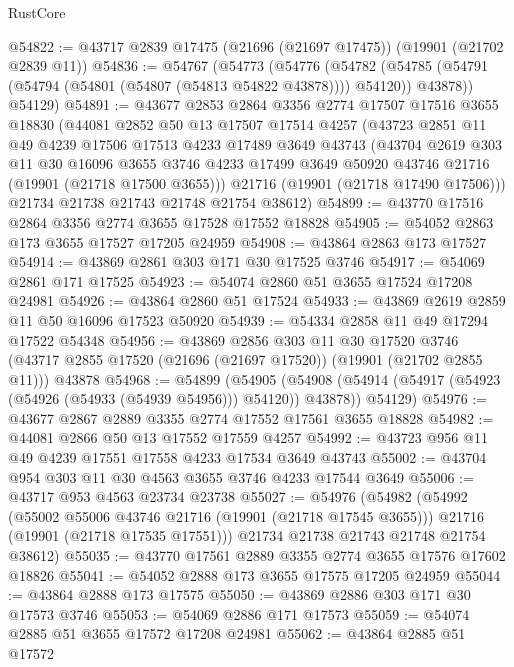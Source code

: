 \begin{lexlean}{RustCore}
\begin{coremodule}
@54822 := @43717 @2839 @17475 (@21696 (@21697 @17475)) (@19901 (@21702 @2839 @11))
@54836 := @54767
    (@54773
      (@54776
        (@54782 (@54785 (@54791 (@54794 (@54801 (@54807 (@54813 @54822 @43878)))) @54120)) @43878))
      @54129)
@54891 := @43677
    @2853
    @2864
    @3356
    @2774
    @17507
    @17516
    @3655
    @18830
    (@44081
      @2852
      @50
      @13
      @17507
      @17514
      @4257
      (@43723
        @2851
        @11
        @49
        @4239
        @17506
        @17513
        @4233
        @17489
        @3649
        @43743
        (@43704
          @2619
          @303
          @11
          @30
          @16096
          @3655
          @3746
          @4233
          @17499
          @3649
          @50920
          @43746
          @21716
          (@19901 (@21718 @17500 @3655)))
        @21716
        (@19901 (@21718 @17490 @17506)))
      @21734
      @21738
      @21743
      @21748
      @21754
      @38612)
@54899 := @43770 @17516 @2864 @3356 @2774 @3655 @17528 @17552 @18828
@54905 := @54052 @2863 @173 @3655 @17527 @17205 @24959
@54908 := @43864 @2863 @173 @17527
@54914 := @43869 @2861 @303 @171 @30 @17525 @3746
@54917 := @54069 @2861 @171 @17525
@54923 := @54074 @2860 @51 @3655 @17524 @17208 @24981
@54926 := @43864 @2860 @51 @17524
@54933 := @43869 @2619 @2859 @11 @50 @16096 @17523 @50920
@54939 := @54334 @2858 @11 @49 @17294 @17522 @54348
@54956 := @43869
    @2856
    @303
    @11
    @30
    @17520
    @3746
    (@43717 @2855 @17520 (@21696 (@21697 @17520)) (@19901 (@21702 @2855 @11)))
    @43878
@54968 := @54899
    (@54905
      (@54908 (@54914 (@54917 (@54923 (@54926 (@54933 (@54939 @54956))) @54120)) @43878))
      @54129)
@54976 := @43677 @2867 @2889 @3355 @2774 @17552 @17561 @3655 @18828
@54982 := @44081 @2866 @50 @13 @17552 @17559 @4257
@54992 := @43723 @956 @11 @49 @4239 @17551 @17558 @4233 @17534 @3649 @43743
@55002 := @43704 @954 @303 @11 @30 @4563 @3655 @3746 @4233 @17544 @3649
@55006 := @43717 @953 @4563 @23734 @23738
@55027 := @54976
    (@54982
      (@54992
        (@55002 @55006 @43746 @21716 (@19901 (@21718 @17545 @3655)))
        @21716
        (@19901 (@21718 @17535 @17551)))
      @21734
      @21738
      @21743
      @21748
      @21754
      @38612)
@55035 := @43770 @17561 @2889 @3355 @2774 @3655 @17576 @17602 @18826
@55041 := @54052 @2888 @173 @3655 @17575 @17205 @24959
@55044 := @43864 @2888 @173 @17575
@55050 := @43869 @2886 @303 @171 @30 @17573 @3746
@55053 := @54069 @2886 @171 @17573
@55059 := @54074 @2885 @51 @3655 @17572 @17208 @24981
@55062 := @43864 @2885 @51 @17572

\end{coremodule}
\end{lexlean}

